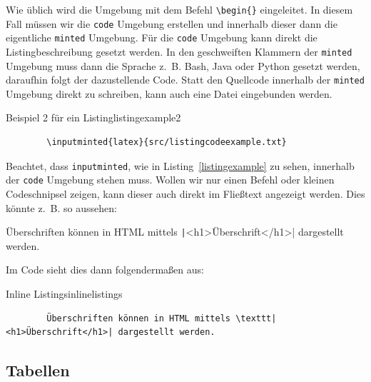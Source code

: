 Wie üblich wird die Umgebung mit dem Befehl \texttt{\textbackslash begin\{\}}
eingeleitet. In diesem Fall müssen wir die \texttt{code} Umgebung erstellen und
innerhalb dieser dann die eigentliche \texttt{minted} Umgebung. Für die
\texttt{code} Umgebung kann direkt die Listingbeschreibung gesetzt werden. In
den geschweiften Klammern der \texttt{minted} Umgebung muss dann die Sprache
z. B. Bash, Java oder Python gesetzt werden, daraufhin folgt der dazustellende
Code. Statt den Quellcode innerhalb der \texttt{minted} Umgebung direkt zu
schreiben, kann auch eine Datei eingebunden werden.

\begin{code}{Beispiel 2 für ein Listing}{listingexample2}
	\begin{verbatim}
		\inputminted{latex}{src/listingcodeexample.txt}	
	\end{verbatim}
\end{code}

Beachtet, dass \texttt{inputminted}, wie in Listing~\ref{listingexample} zu
sehen, innerhalb der \texttt{code} Umgebung stehen muss. Wollen wir nur einen
Befehl oder kleinen Codeschnipsel zeigen, kann dieser auch direkt im Fließtext
angezeigt werden. Dies könnte z. B. so aussehen:

Überschriften können in HTML mittels \texttt|<h1>Überschrift</h1>|
dargestellt werden.

Im Code sieht dies dann folgendermaßen aus:

\begin{code}{Inline Listings}{inlinelistings}
	\begin{verbatim}
		Überschriften können in HTML mittels \texttt|<h1>Überschrift</h1>| dargestellt werden.
	\end{verbatim}
\end{code}

\subsection{Tabellen}\label{tabellen}

